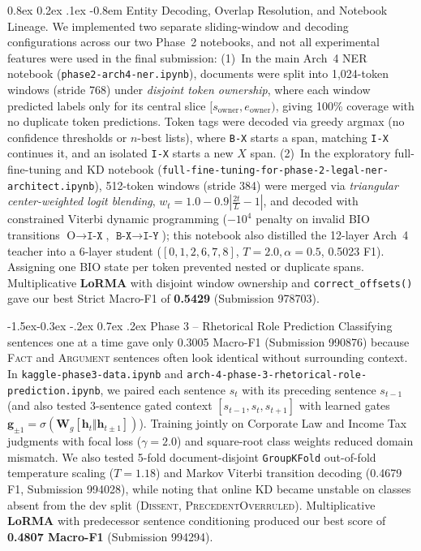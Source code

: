 \documentclass[11pt, oneside]{article}
\makeatletter
\renewcommand\subsection{\@startsection{subsection}{2}{\z@}%
  {-1.5ex\@plus -0.3ex \@minus -.2ex}%
  {0.7ex \@plus .2ex}%
  {\normalfont\large\bfseries}}
\renewcommand\paragraph{\@startsection{paragraph}{4}{\z@}%
  {0.8ex \@plus0.2ex \@minus.1ex}%
  {-0.8em}%
  {\normalfont\normalsize\bfseries}}
\makeatother
\begin{document}
\paragraph{Entity Decoding, Overlap Resolution, and Notebook Lineage.}
We implemented two separate sliding-window and decoding configurations across our two Phase~2 notebooks, and not all experimental features were used in the final submission: (1)~In the main Arch~4 NER notebook (\texttt{phase2-arch4-ner.ipynb}), documents were split into 1,024-token windows (stride 768) under \emph{disjoint token ownership}, where each window predicted labels only for its central slice $[s_{\text{owner}}, e_{\text{owner}})$, giving 100\% coverage with no duplicate token predictions. Token tags were decoded via greedy argmax (no confidence thresholds or $n$-best lists), where \texttt{B-X} starts a span, matching \texttt{I-X} continues it, and an isolated \texttt{I-X} starts a new $X$ span. (2)~In the exploratory full-fine-tuning and KD notebook (\texttt{full-fine-tuning-for-phase-2-legal-ner-architect.ipynb}), 512-token windows (stride 384) were merged via \emph{triangular center-weighted logit blending}, $w_t = 1.0 - 0.9\left|\frac{2t}{L}-1\right|$, and decoded with constrained Viterbi dynamic programming ($-10^4$ penalty on invalid BIO transitions $\text{O}\to\texttt{I-X}$, $\texttt{B-X}\to\texttt{I-Y}$); this notebook also distilled the 12-layer Arch~4 teacher into a 6-layer student ($[0,1,2,6,7,8]$, $T=2.0, \alpha=0.5$, 0.5023 F1). Assigning one BIO state per token prevented nested or duplicate spans. Multiplicative \textbf{LoRMA} with disjoint window ownership and \texttt{correct\_offsets()} gave our best Strict Macro-F1 of \textbf{0.5429} (Submission 978703).

\subsection{Phase 3 -- Rhetorical Role Prediction}
Classifying sentences one at a time gave only 0.3005 Macro-F1 (Submission 990876) because \textsc{Fact} and \textsc{Argument} sentences often look identical without surrounding context. In \texttt{kaggle-phase3-data.ipynb} and \texttt{arch-4-phase-3-rhetorical-role-prediction.ipynb}, we paired each sentence $s_t$ with its preceding sentence $s_{t-1}$ (and also tested 3-sentence gated context $[s_{t-1}, s_t, s_{t+1}]$ with learned gates $\mathbf{g}_{\pm 1} = \sigma(\mathbf{W}_g [\mathbf{h}_t \Vert \mathbf{h}_{t\pm 1}])$). Training jointly on Corporate Law and Income Tax judgments with focal loss ($\gamma=2.0$) and square-root class weights reduced domain mismatch. We also tested 5-fold document-disjoint \texttt{GroupKFold} out-of-fold temperature scaling ($T=1.18$) and Markov Viterbi transition decoding (0.4679 F1, Submission 994028), while noting that online KD became unstable on classes absent from the dev split (\textsc{Dissent}, \textsc{PrecedentOverruled}). Multiplicative \textbf{LoRMA} with predecessor sentence conditioning produced our best score of \textbf{0.4807 Macro-F1} (Submission 994294).
\end{document}
